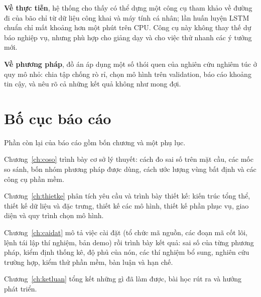 \textbf{Về thực tiễn}, hệ thống cho thấy có thể dựng một công cụ tham khảo về
đường đi của bão chỉ từ dữ liệu công khai và máy tính cá nhân; lần huấn luyện
LSTM chuẩn chỉ mất khoảng hơn một phút trên CPU. Công cụ này không thay thế
dự báo nghiệp vụ, nhưng phù hợp cho giảng dạy và cho việc thử nhanh các ý
tưởng mới.

\textbf{Về phương pháp}, đồ án áp dụng một số thói quen của nghiên cứu nghiêm
túc ở quy mô nhỏ: chia tập chống rò rỉ, chọn mô hình trên validation, báo cáo
khoảng tin cậy, và nêu rõ cả những kết quả không như mong đợi.

\section{Bố cục báo cáo}

Phần còn lại của báo cáo gồm bốn chương và một phụ lục.

Chương~\ref{ch:coso} trình bày cơ sở lý thuyết: cách đo sai số trên mặt cầu,
các mốc so sánh, bốn nhóm phương pháp được dùng, cách ước lượng vùng bất định
và các công cụ phần mềm.

Chương~\ref{ch:thietke} phân tích yêu cầu và trình bày thiết kế: kiến trúc
tổng thể, thiết kế dữ liệu và đặc trưng, thiết kế các mô hình, thiết kế phần
phục vụ, giao diện và quy trình chọn mô hình.

Chương~\ref{ch:caidat} mô tả việc cài đặt (tổ chức mã nguồn, các đoạn mã cốt
lõi, lệnh tái lập thí nghiệm, bản demo) rồi trình bày kết quả: sai số của từng
phương pháp, kiểm định thống kê, độ phủ của nón, các thí nghiệm bổ sung, nghiên
cứu trường hợp, kiểm thử phần mềm, bàn luận và hạn chế.

Chương~\ref{ch:ketluan} tổng kết những gì đã làm được, bài học rút ra và
hướng phát triển.
